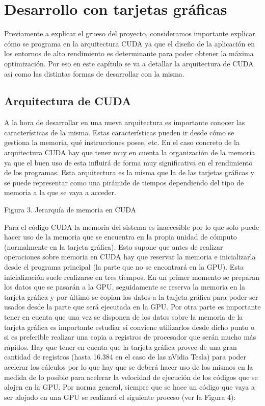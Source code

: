 \chapter{Desarrollo con tarjetas gráficas}

Previamente a explicar el grueso del proyecto, consideramos importante explicar cómo se programa en la arquitectura CUDA ya que el diseño de la aplicación en los entornos de alto rendimiento es determinante para poder obtener la máxima optimización. Por eso en este capítulo se va a detallar la arquitectura de CUDA así como las distintas formas de desarrollar con la misma.

\section{Arquitectura de CUDA}
A la hora de desarrollar en una nueva arquitectura es importante conocer las características de la misma. Estas características pueden ir desde cómo se gestiona la memoria, qué instrucciones posee, etc.
En el caso concreto de la arquitectura CUDA hay que tener muy en cuenta la organización de la memoria ya que el buen uso de esta influirá de forma muy significativa en el rendimiento de los programas. Esta arquitectura es la misma que la de las tarjetas gráficas y se puede representar como una pirámide de tiempos dependiendo del tipo de memoria a la que se vaya a acceder.
 
Figura 3. Jerarquía de memoria en CUDA

Para el código CUDA la memoria del sistema es inaccesible por lo que solo puede hacer uso de la memoria que se encuentra en la propia unidad de cómputo (normalmente en la tarjeta gráfica). Esto supone que antes de realizar operaciones sobre memoria en CUDA hay que reservar la memoria e inicializarla desde el programa principal (la parte que no se encontrará en la GPU). Esta inicialización suele realizarse en tres tiempos. En un primer momento se preparan los datos que se pasarán a la GPU, seguidamente se reserva la memoria en la tarjeta gráfica y por último se copian los datos a la tarjeta gráfica para poder ser usados desde la parte que será ejecutada en la GPU.
Por otra parte es importante tener en cuenta que una vez se disponen de los datos sobre la memoria de la tarjeta gráfica es importante estudiar si conviene utilizarlos desde dicho punto o si es preferible realizar una copia a registros de procesador que serán mucho más rápidos. Hay que tener en cuenta que la tarjeta gráfica provee de una gran cantidad de registros (hasta 16.384 en el caso de las nVidia Tesla) para poder acelerar los cálculos por lo que hay que se deberá hacer uso de los mismos en la medida de lo posible para acelerar la velocidad de ejecución de los códigos que se alojen en la GPU.
Por norma general, siempre que se hace un código que vaya a ser alojado en una GPU se realizará el siguiente proceso (ver la Figura 4):

